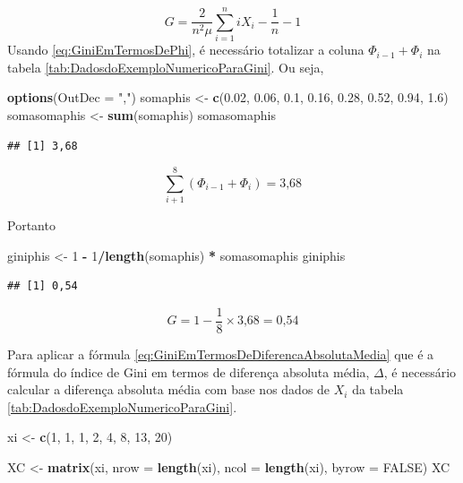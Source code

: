 \documentclass[
]{book}
\newenvironment{Shaded}{\begin{snugshade}}{\end{snugshade}}
\newcommand{\DataTypeTok}[1]{\textcolor[rgb]{0.13,0.29,0.53}{#1}}
\newcommand{\DecValTok}[1]{\textcolor[rgb]{0.00,0.00,0.81}{#1}}
\newcommand{\FloatTok}[1]{\textcolor[rgb]{0.00,0.00,0.81}{#1}}
\newcommand{\KeywordTok}[1]{\textcolor[rgb]{0.13,0.29,0.53}{\textbf{#1}}}
\newcommand{\NormalTok}[1]{#1}
\newcommand{\OperatorTok}[1]{\textcolor[rgb]{0.81,0.36,0.00}{\textbf{#1}}}
\newcommand{\OtherTok}[1]{\textcolor[rgb]{0.56,0.35,0.01}{#1}}
\newcommand{\StringTok}[1]{\textcolor[rgb]{0.31,0.60,0.02}{#1}}
\begin{document}
\[
G = \dfrac{2}{n^2\mu}\sum_{i=1}^{n} iX_i - \dfrac{1}{n} - 1
\]
Usando \eqref{eq:GiniEmTermosDePhi}, é necessário totalizar a coluna \(\Phi_{i-1} + \Phi_i\) na tabela \ref{tab:DadosdoExemploNumericoParaGini}. Ou seja,

\begin{Shaded}
\begin{Highlighting}[]
\KeywordTok{options}\NormalTok{(}\DataTypeTok{OutDec =} \StringTok{","}\NormalTok{)}
\NormalTok{somaphis <-}\StringTok{ }\KeywordTok{c}\NormalTok{(}\FloatTok{0.02}\NormalTok{, }\FloatTok{0.06}\NormalTok{, }\FloatTok{0.1}\NormalTok{, }\FloatTok{0.16}\NormalTok{, }\FloatTok{0.28}\NormalTok{, }\FloatTok{0.52}\NormalTok{, }\FloatTok{0.94}\NormalTok{, }
    \FloatTok{1.6}\NormalTok{)}
\NormalTok{somasomaphis <-}\StringTok{ }\KeywordTok{sum}\NormalTok{(somaphis)}
\NormalTok{somasomaphis}
\end{Highlighting}
\end{Shaded}

\begin{verbatim}
## [1] 3,68
\end{verbatim}

\[
\sum_{i+1}^{8} (\Phi_{i-1} + \Phi_i) = \text{3,68}
\]

Portanto

\begin{Shaded}
\begin{Highlighting}[]
\NormalTok{giniphis <-}\StringTok{ }\DecValTok{1} \OperatorTok{-}\StringTok{ }\DecValTok{1}\OperatorTok{/}\KeywordTok{length}\NormalTok{(somaphis) }\OperatorTok{*}\StringTok{ }\NormalTok{somasomaphis}
\NormalTok{giniphis}
\end{Highlighting}
\end{Shaded}

\begin{verbatim}
## [1] 0,54
\end{verbatim}

\[
G = 1 - \dfrac{1}{8}\times \text{3,68} = \text{0,54}
\]

Para aplicar a fórmula \eqref{eq:GiniEmTermosDeDiferencaAbsolutaMedia} que é a fórmula do índice de Gini em termos de diferença absoluta média, \(\Delta\), é necessário calcular a diferença absoluta média com base nos dados de \(X_i\) da tabela \ref{tab:DadosdoExemploNumericoParaGini}.

\begin{Shaded}
\begin{Highlighting}[]
\NormalTok{xi <-}\StringTok{ }\KeywordTok{c}\NormalTok{(}\DecValTok{1}\NormalTok{, }\DecValTok{1}\NormalTok{, }\DecValTok{1}\NormalTok{, }\DecValTok{2}\NormalTok{, }\DecValTok{4}\NormalTok{, }\DecValTok{8}\NormalTok{, }\DecValTok{13}\NormalTok{, }\DecValTok{20}\NormalTok{)}

\NormalTok{XC <-}\StringTok{ }\KeywordTok{matrix}\NormalTok{(xi, }\DataTypeTok{nrow =} \KeywordTok{length}\NormalTok{(xi), }\DataTypeTok{ncol =} \KeywordTok{length}\NormalTok{(xi), }
    \DataTypeTok{byrow =} \OtherTok{FALSE}\NormalTok{)}
\NormalTok{XC}
\end{Highlighting}
\end{Shaded}
\end{document}
